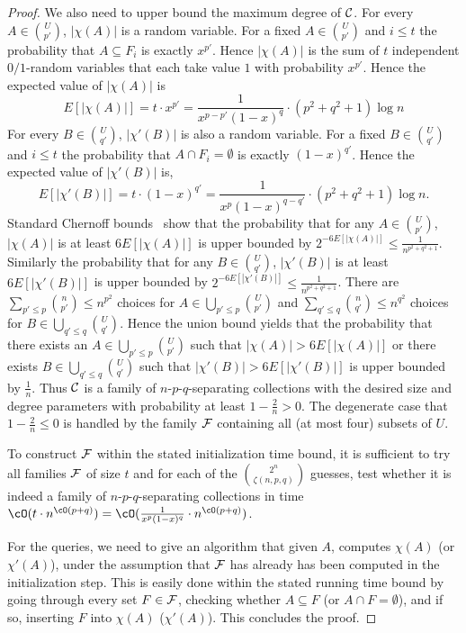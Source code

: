 \begin{proof}
We also need to upper bound the maximum degree of ${\cal C}$. For every $A \in  {U \choose p'}$, $|\chi(A)|$ is a random variable. For a fixed $A \in  {U \choose p'}$ and $i \leq t$ the probability 
that $A \subseteq F_i$ is exactly $x^{p'}$. Hence $|\chi(A)|$ is the sum of $t$ independent  $0/1$-random variables that each take value $1$ with probability $x^{p'}$. Hence the expected value of $|\chi(A)|$ is 
$$E[|\chi(A)|] = t \cdot x^{p'} = \frac{1}{x^{p-p'}(1-x)^q}\cdot (p^2+q^2+1)\log n$$ 
For every $B\in {U\choose q'}$, $|\chi'(B)|$ is also a random variable. For a fixed $B \in  {U \choose q'}$ and $i \leq t$ the probability that $A \cap F_i=\emptyset$ is exactly $(1-x)^{q'}$. 
Hence the expected value of $|\chi'(B)|$ is,
$$E[|\chi'(B)|] = t \cdot (1-x)^{q'} = \frac{1}{x^{p}(1-x)^{q-q'}}\cdot (p^2+q^2+1)\log n.$$
Standard Chernoff bounds~\cite[Theorem 4.4]{mitzenmacher2005probability} show that the probability that for any $A\in{U\choose p'}$, $|\chi(A)|$ 
is at least $6E[|\chi(A)|]$ is upper bounded by $2^{-6E[|\chi(A)|]} \leq \frac{1}{n^{p^2+q^2+1}}$. 
Similarly the probability that for any $B\in{U \choose q'}$, $|\chi'(B)|$ is at least $6E[|\chi'(B)|]$ is upper bounded by $2^{-6E[|\chi'(B)|]} \leq \frac{1}{n^{p^2+q^2+1}}$.  
There are  $\sum_{p'\leq p}{n \choose p'}\leq{n^{p^2}}$ choices for $A\in\bigcup_{p'\leq p}{U\choose p'}$ and $\sum_{q'\leq q}{n \choose q'}\leq{n^{q^2}}$ choices for $B\in\bigcup_{q'\leq q}{U\choose q'}$. 
Hence the union bound yields that the probability that there exists an $A\in\bigcup_{p'\leq p}{U\choose p'}$ such that $|\chi(A)|  > 6E[|\chi(A)|]$ or there exists $B\in \bigcup_{q'\leq q}{U\choose q'}$ such 
that $|\chi'(B)|  > 6E[|\chi'(B)|]$ is upper bounded by $\frac {1}{n}$. Thus ${\cal C}$ is a family of $n$-$p$-$q$-separating collections with the desired size and degree parameters with probability at least 
$1 - \frac{2}{n} > 0$. The degenerate case that  $1 - \frac{2}{n} \leq 0$ is handled 
by the family ${\cal F}$ containing all (at most four) subsets of $U$. 

To construct ${\cal F}$ within the stated initialization time bound, it is sufficient to try all families ${\cal F}$ of size $t$ and for each of the ${2^n \choose \zeta(n,p,q)}$ 
guesses, test whether it is indeed a family of $n$-$p$-$q$-separating collections in time $\cO(t \cdot n^{\cO(p+q)}) = \cO(\frac{1}{x^p(1-x)^q} \cdot n^{\cO(p+q)})$.

For the queries, we need to give an algorithm that given $A$, computes $\chi(A)$ (or $\chi'(A)$), under the assumption that ${\cal F}$ has already has been computed in the initialization step. 
This is easily done within the stated running time bound by going through every set $F \in {\cal F}$, checking whether $A \subseteq F$ (or $A\cap F=\emptyset$), and if so, inserting $F$ into $\chi(A)$ ($\chi'(A)$). 
This concludes the proof.
\end{proof}
